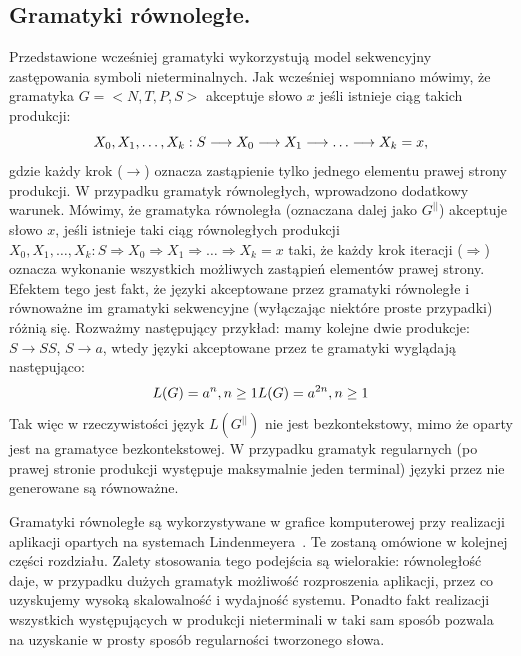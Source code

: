\subsection{Gramatyki równoległe.}
Przedstawione wcześniej gramatyki wykorzystują model sekwencyjny zastępowania
symboli nieterminalnych. Jak wcześniej wspomniano mówimy, że gramatyka
$G=<N,T,P,S>$ akceptuje słowo $x$ jeśli istnieje ciąg takich produkcji:
\begin{equation}
X_0,X_1,\ldots,X_k:S\longrightarrow X_0\longrightarrow
X_1\longrightarrow\ldots\longrightarrow X_k=x,
\vspace{-10pt}
\end{equation}
gdzie każdy krok ($\longrightarrow$) oznacza zastąpienie tylko jednego elementu
prawej strony produkcji. W przypadku gramatyk równoległych, wprowadzono
dodatkowy warunek. Mówimy, że gramatyka równoległa (oznaczana dalej jako
$G^{||}$) akceptuje słowo $x$, jeśli istnieje taki ciąg równoległych produkcji
$X_0,X_1,\ldots,X_k:S\Longrightarrow X_0 \Longrightarrow
X_1\Longrightarrow\ldots\Longrightarrow X_k=x$ taki, że każdy krok iteracji
($\Longrightarrow$) oznacza wykonanie wszystkich możliwych zastąpień elementów
prawej strony. Efektem tego jest fakt, że języki akceptowane przez gramatyki
równoległe i równoważne im gramatyki sekwencyjne (wyłączając niektóre proste
przypadki) różnią się.
Rozważmy następujący przykład: mamy kolejne dwie produkcje: $S\longrightarrow
SS$, $S\longrightarrow a$, wtedy języki akceptowane przez te gramatyki wyglądają
następująco:
\begin{equation}
L(G)={a^n,n\geq 1}\\
L(G)={a^{2n},n\geq 1}
\vspace{-10pt}
\end{equation}
Tak więc w rzeczywistości język $L(G^{||})$ nie jest bezkontekstowy, mimo że
oparty jest na gramatyce bezkontekstowej. W przypadku gramatyk regularnych (po
prawej stronie produkcji występuje maksymalnie jeden terminal) języki przez nie
generowane są równoważne.


Gramatyki równoległe są wykorzystywane w grafice komputerowej przy realizacji
aplikacji opartych na systemach Lindenmeyera~\cite{lindenmeyer}. Te zostaną
omówione w kolejnej części rozdziału. Zalety stosowania tego podejścia są wielorakie: równoległość
daje, w przypadku dużych gramatyk możliwość rozproszenia aplikacji, przez co
uzyskujemy wysoką skalowalność i wydajność systemu. Ponadto fakt realizacji
wszystkich występujących w produkcji nieterminali w taki sam sposób pozwala na
uzyskanie w prosty sposób regularności tworzonego słowa.


